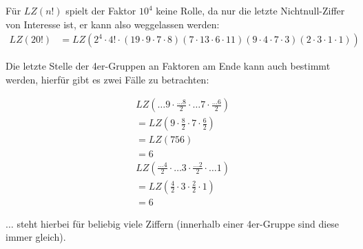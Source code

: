 \documentclass[12pt,a4paper,oneside]{article}
\newenvironment{Together}
{\vbox\bgroup}
{\egroup}
\begin{document}
Für $LZ(n!)$ spielt der Faktor $10^4$ keine Rolle, da nur die letzte Nichtnull-Ziffer von Interesse ist, er kann also weggelassen werden:
\begin{equation*}
	\begin{split}
		LZ(20!) &= LZ\left(2^4 \cdot 4! \cdot (19\cdot9\cdot7\cdot8)(7\cdot13\cdot6\cdot11)(9\cdot4\cdot7\cdot3)(2\cdot3\cdot1\cdot1)\right)
	\end{split}
\end{equation*}

\begin{Together}
Die letzte Stelle der 4er-Gruppen an Faktoren am Ende kann auch bestimmt werden, hierfür gibt es zwei Fälle zu betrachten:
\begin{multicols}{2}
	\noindent
	\begin{equation*}
		\begin{split}
			&LZ\left(\dots9 \cdot \frac{\dots8}{2} \cdot \dots7 \cdot \frac{\dots6}{2}\right) \\
			&= LZ\left(9\cdot\frac{8}{2}\cdot7\cdot\frac{6}{2}\right) \\
			&= LZ(756) \\
			&= 6
		\end{split}
	\end{equation*}
	\begin{equation*}
		\begin{split}
			&LZ\left(\frac{\dots4}{2} \cdot \dots3 \cdot \frac{\dots2}{2} \cdot \dots1\right) \\
			&= LZ\left(\frac{4}{2} \cdot 3 \cdot \frac{2}{2} \cdot 1\right) \\
			&= 6
		\end{split}
	\end{equation*}
\end{multicols}
$\dots$ steht hierbei für beliebig viele Ziffern (innerhalb einer 4er-Gruppe sind diese immer gleich). \\[10pt]
\end{Together}
\end{document}
